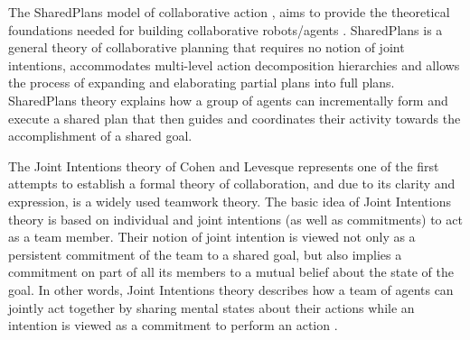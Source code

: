 \documentclass[a4paper, 11pt]{article}
\begin{document}
\begin{small}
The SharedPlans model of collaborative action \cite{grosz:planning-acting,
grosz:collaboration, grosz:plans-discourse}, aims to provide the theoretical
foundations needed for building collaborative robots/agents
\cite{grosz:collaborative-systems}. SharedPlans is a general theory of
collaborative planning that requires no notion of joint intentions, accommodates
multi-level action decomposition hierarchies and allows the process of expanding
and elaborating partial plans into full plans. SharedPlans theory explains how a
group of agents can incrementally form and execute a shared plan that then
guides and coordinates their activity towards the accomplishment of a shared
goal.


The Joint Intentions theory of Cohen and Levesque \cite{cohen:teamwork,
cohen:intention-commitment, cohen:persistence-intention-commitment,
cohen:intentions, levesque:acting-together} represents one of the first attempts
to establish a formal theory of collaboration, and due to its clarity and
expression, is a widely used teamwork theory. The basic idea of Joint Intentions
theory is based on individual and joint intentions (as well as commitments) to
act as a team member. Their notion of joint intention is viewed not only as a
persistent commitment of the team to a shared goal, but also implies a
commitment on part of all its members to a mutual belief about the state of the
goal. In other words, Joint Intentions theory describes how a team of agents can
jointly act together by sharing mental states about their actions while an
intention is viewed as a commitment to perform an action 
\cite{cohen:intention-commitment}.


\end{small}
\end{document}
